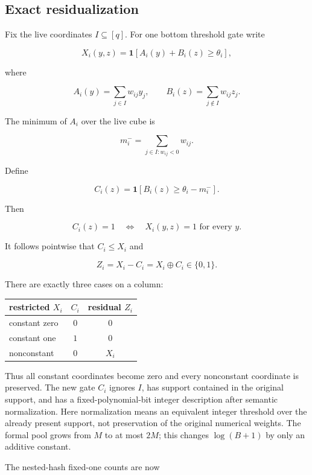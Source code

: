 \documentclass[11pt,letterpaper]{article}
\theoremstyle{definition}
\theoremstyle{remark}
\begin{document}
\subsection{Exact residualization}\label{a2-exact-residualization}

Fix the live coordinates \(I\subseteq[q]\). For one bottom threshold
gate write

\[
X_i(y,z)=\mathbf1[A_i(y)+B_i(z)\ge\theta_i],
\]

where

\[
A_i(y)=\sum_{j\in I}w_{ij}y_j,
\qquad
B_i(z)=\sum_{j\notin I}w_{ij}z_j.
\]

The minimum of \(A_i\) over the live cube is

\[
m_i^-=\sum_{j\in I:w_{ij}<0}w_{ij}.
\]

Define

\[
C_i(z)=\mathbf1[B_i(z)\ge\theta_i-m_i^-].
\]

Then

\[
C_i(z)=1
\quad\Longleftrightarrow\quad
X_i(y,z)=1\text{ for every }y.
\]

It follows pointwise that \(C_i\le X_i\) and

\[
Z_i=X_i-C_i=X_i\oplus C_i\in\{0,1\}.
\]

There are exactly three cases on a column:

\begin{center}
\begin{tabular}{@{}lcc@{}}
\toprule
restricted \(X_i\) & \(C_i\) & residual \(Z_i\) \\
\midrule
constant zero & \(0\) & \(0\) \\
constant one & \(1\) & \(0\) \\
nonconstant & \(0\) & \(X_i\) \\
\bottomrule
\end{tabular}
\end{center}

Thus all constant coordinates become zero and every nonconstant
coordinate is preserved. The new gate \(C_i\) ignores \(I\), has support
contained in the original support, and has a fixed-polynomial-bit
integer description after semantic normalization. Here normalization
means an equivalent integer threshold over the already present support,
not preservation of the original numerical weights. The formal pool
grows from \(M\) to at most \(2M\); this changes \(\log(B+1)\) by only
an additive constant.

The nested-hash fixed-one counts are now
\end{document}
